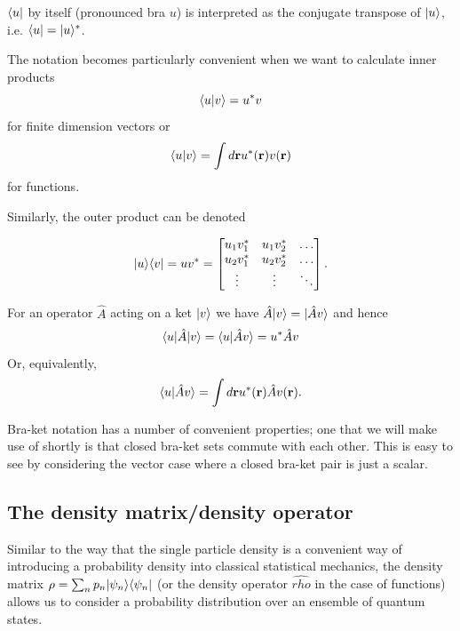 \documentclass{article}
\begin{document}
$\langle u |$ by itself (pronounced bra $u$) is interpreted as the conjugate transpose of $| u \rangle$, i.e. $\langle u |=| u \rangle^*$.

The notation becomes particularly convenient when we want to calculate inner products
$$
	\langle u | v\rangle = u^*v
$$
for finite dimension vectors or 
$$
	\langle u | v\rangle =	\int d{\bf r}u^*({\bf r})v({\bf r})
$$
for functions.

Similarly, the outer product can be denoted 

$$
| u \rangle\langle v |=uv^* =
\begin{bmatrix}
    u_1v^*_1 & u_1v^*_2  & \dots \\
    u_2v^*_1 & u_2v^*_2  & \dots   \\
    \vdots & \vdots & \ddots 
\end{bmatrix}.
$$

For an operator $\hat{A}$ acting on a ket $| v \rangle$ we have $\hat{A}| v \rangle = | \hat{A}v \rangle$ and hence 
$$
	\langle u |\hat{A}| v \rangle=\langle u | \hat{A}v\rangle = u^*\hat{A}v
$$
Or, equivalently,  
$$
	\langle u | \hat{A}v\rangle = \int d{\bf r} u^*({\bf r}) \hat{A} v({\bf r}).
$$

Bra-ket notation has a number of convenient properties; one that we will make use of shortly is that closed bra-ket sets commute with each other. This is easy to see by considering the vector case where a closed bra-ket pair is just a scalar.

\subsection*{The density matrix/density operator}
Similar to the way that the single particle density is a convenient way of introducing a probability density into classical statistical mechanics, the density matrix $\rho = \sum_n p_n| \psi_n \rangle\langle \psi_n |$ (or the density operator $\hat{rho}$ in the case of functions) allows us to consider a probability distribution over an ensemble of quantum states.
\end{document}
